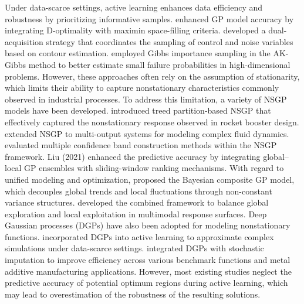 \documentclass[]{interact}
\theoremstyle{plain}%
\theoremstyle{definition}
\theoremstyle{remark}
\begin{document}
Under data-scarce settings, active learning enhances data efficiency and robustness by prioritizing informative samples. \citet{Chen2021} enhanced GP model accuracy by integrating D-optimality with maximin space-filling criteria.  \citet{Han2021} developed a dual-acquisition strategy that coordinates the sampling of control and noise variables based on contour estimation.   \citet{Zhang2024} employed Gibbs importance sampling in the AK-Gibbs method to better estimate small failure probabilities in high-dimensional problems. However, these approaches often rely on the assumption of stationarity, which limits their ability to capture nonstationary characteristics commonly observed in industrial processes. To address this limitation, a variety of NSGP models have been developed.  \citet{Gramacy2008} introduced treed partition-based NSGP that effectively captured the nonstationary response observed in rocket booster design.   \citet{Konomi2014} extended NSGP to multi-output systems for modeling complex fluid dynamics.   \citet{Rhode2020} evaluated multiple confidence band construction methods within the NSGP framework. Liu (2021) enhanced the predictive accuracy by integrating global–local GP ensembles with sliding-window ranking mechanisms. With regard to unified modeling and optimization,  \citet{Davis2021} proposed the Bayesian composite GP model, which decouples global trends and local fluctuations through non-constant variance structures.  \citet{Meng2022} developed the combined framework to balance global exploration and local exploitation in multimodal response surfaces. Deep Gaussian processes (DGPs) have also been adopted for modeling nonstationary functions.  \citet{Sauer2022} incorporated DGPs into active learning to approximate complex simulations under data-scarce settings.   \citet{Gnanasambandam2024} integrated  DGPs with stochastic imputation to improve efficiency across various benchmark functions and metal additive manufacturing applications. However, most existing studies neglect the predictive accuracy of potential optimum regions during active learning, which may lead to overestimation of the robustness of the resulting solutions.
\end{document}
